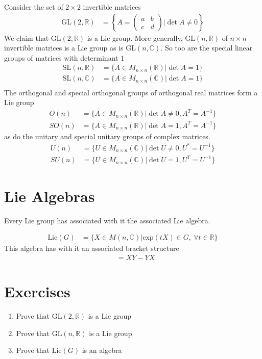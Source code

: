 \documentclass[book.tex]{subfiles}
\begin{document}
Consider the set of $2 \times 2$ invertible matrices
\begin{align}
    \textrm{GL}(2, \mathbb{R}) &= \left \{A = \begin{pmatrix} a & b \\ c & d \end{pmatrix} | \det A \neq 0\right \} 
\end{align}
We claim that $\textrm{GL}(2, \mathbb{R})$ is a Lie group. More generally, $\textrm{GL}(n, \mathbb{R})$ of $n \times n$ invertible matrices is a Lie group as is $\textrm{GL}(n, \mathbb{C})$. So too are the special linear groups of matrices with determinant $1$
\begin{align}
    \textrm{SL}(n, \mathbb{R}) &= \{ A \in M_{n\times n}(\mathbb{R}) | \det A = 1 \} \\
    \textrm{SL}(n, \mathbb{C}) &= \{ A \in M_{n\times n}(\mathbb{C}) | \det A = 1 \} \\
\end{align}
The orthogonal and special orthogonal groups of orthogonal real matrices form a Lie group
\begin{align}
    O(n) &= \{ A \in M_{n \times n}(\mathbb{R}) | \det A \neq 0, A^T = A^{-1} \} \\
    SO(n) &= \{ A \in M_{n \times n}(\mathbb{R}) | \det A = 1, A^T = A^{-1} \}
\end{align}
as do the unitary and special unitary groups of complex matrices.
\begin{align}
    U(n) &= \{ U \in M_{n \times n}(\mathbb{C}) | \det U \neq 0, U^* = U^{-1} \} \\
    SU(n) &= \{ U \in M_{n \times n}(\mathbb{C}) | \det U = 1, U^T = U^{-1} \}
\end{align}

\section{Lie Algebras}

Every Lie group has associated with it the associated Lie algebra. 


\begin{align}
    \textrm{Lie}(G) &= \{ X \in M(n, \mathbb{C}) | \textrm{exp}(t X) \in G, \ \forall t \in \mathbb{R} \}
\end{align}
This algebra has with it an associated bracket structure
\begin{align}
    [X, Y] &= XY - YX
\end{align}

\section{Exercises}
\begin{enumerate}
    \item Prove that $\textrm{GL}(2, \mathbb{R})$ is a Lie group
    \item Prove that $\textrm{GL}(n, \mathbb{R})$ is a Lie group
    \item Prove that $\textrm{Lie}(G)$ is an algebra
\end{enumerate}
\end{document}
